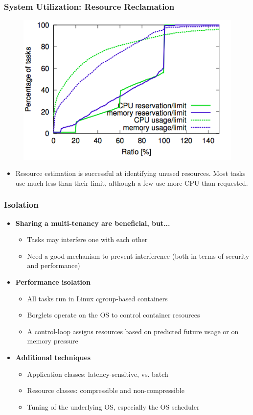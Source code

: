 \begin{frame}
\frametitle{System Utilization: Resource Reclamation}
\begin{figure}[h]
  \centering
  \includegraphics[scale=0.4]{./figures/borg_exp_reclamation2}
  \label{fig:borg_exp_reclamation2}
\end{figure}
\begin{itemize}
	\item Resource estimation is successful at identifying unused resources. Most tasks use much less than their limit, although a few use more CPU than requested.
\end{itemize}
\end{frame}

\begin{frame}
\frametitle{Isolation}
\begin{itemize}
	\item {\bf Sharing a multi-tenancy are beneficial, but...}
	\begin{itemize}
		\item Tasks may interfere one with each other
		\item Need a good mechanism to prevent interference (both in terms of security and performance)
	\end{itemize}
	\item {\bf Performance isolation}
	\begin{itemize}
		\item All tasks run in Linux cgroup-based containers
		\item Borglets operate on the OS to control container resources
		\item A control-loop assigns resources based on predicted future usage or on memory pressure
	\end{itemize}
	\item {\bf Additional techniques}
	\begin{itemize}
		\item Application classes: latency-sensitive, vs. batch
		\item Resource classes: compressible and non-compressible
		\item Tuning of the underlying OS, especially the OS scheduler
	\end{itemize}
\end{itemize}
\end{frame}

